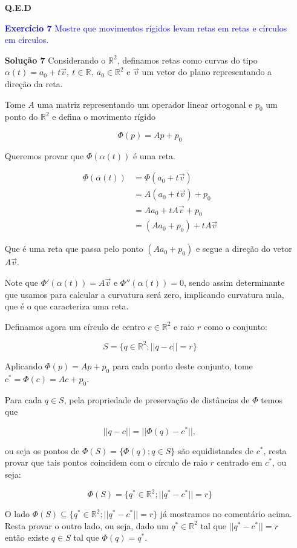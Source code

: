 \documentclass[12pt,letterpaper]{article}
\newcommand{\real}{\mathbb{R}}
\newcommand{\rr}{\mathbb{R}^2}
\newcommand{\ex}[1]{\textcolor{blue}{\textbf{Exercício #1}}}
\newcommand{\sol}[1]{\textbf{Solução #1}}
\begin{document}
\begin{enumerate}
	\textbf{Q.E.D}


	
	\item[\ex{7}]\textcolor{blue}{Mostre que movimentos rígidos levam retas em retas e círculos em círculos.}
	
	\item[\sol{7}] Considerando o $\rr$, definamos retas como curvas do tipo $\alpha(t)=a_0+t\vec v,~t\in\real,~a_0\in\rr$ e $\vec v$ um vetor do plano representando a direção da reta.
	
	Tome $A$ uma matriz representando um operador linear ortogonal e $p_0$ um ponto do $\rr$ e defina o movimento rígido
	
	$$\Phi(p)=Ap+p_0$$
	
	Queremos provar que $\Phi(\alpha(t))$ é uma reta.
	
	\begin{align*}
		\Phi(\alpha(t))&=\Phi(a_0+t\vec v)\\
		&=A(a_0+t\vec v)+p_0\\
		&=Aa_0+tA\vec v +p_0\\
		&=(Aa_0+p_0)+tA\vec v
	\end{align*}

	Que é uma reta que passa pelo ponto $(Aa_0+p_0)$ e segue a direção do vetor $A\vec v$.
	
	Note que  $\Phi'(\alpha(t))=A\vec v$ e $\Phi''(\alpha(t))=0$, sendo assim determinante que usamos para calcular a curvatura será zero, implicando curvatura nula, que é o que caracteriza uma reta.
	
	
	Definamos agora um círculo de centro $c\in\rr$ e raio $r$ como o conjunto:
	
	$$S=\{q\in\rr;||q-c||=r\}$$
	
	Aplicando $\Phi(p)=Ap+p_0$ para cada ponto deste conjunto, tome $c^*=\Phi(c)=Ac+p_0$.
	
	Para cada $q\in S$, pela propriedade de preservação de distâncias de $\Phi$ temos que 
	
	$$||q-c||=||\Phi(q)-c^*||,$$
	
	ou seja os pontos de $\Phi(S)=\{\Phi(q);q\in S\}$ são equidistandes de $c^*$, resta provar que tais pontos coincidem com o círculo de raio $r$ centrado em $c^*$, ou seja:
	
	$$\Phi(S)=\{q^*\in\rr;||q^*-c^*||=r\}$$
	
	O lado $\Phi(S)\subseteq\{q^*\in\rr;||q^*-c^*||=r\}$ já mostramos no comentário acima. Resta provar o outro lado, ou seja, dado um $q^*\in\rr$ tal que $||q^*-c^*||=r$ então existe $q\in S$ tal que $\Phi(q)=q^*$.
	

\end{enumerate}
\end{document}
